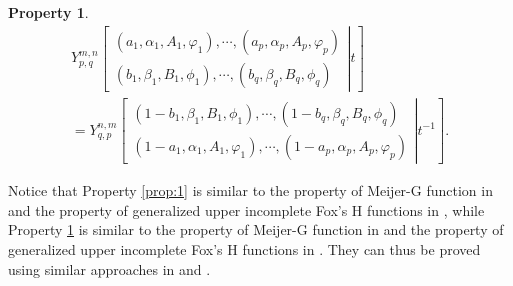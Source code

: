 \documentclass[12pt,onecolumn,draftcls]{IEEEtran}
\newtheorem{property}{Property}
\begin{document}
\begin{property}\label{prop:2}
\begin{multline}\label{eqn:x_1_fox_H}
Y_{p,q}^{m,n}\left[ {\left. {\begin{array}{*{20}{c}}
{\left( {{a_1},{\alpha _1},{A_1},{\varphi _1}} \right), \cdots ,\left( {{a_p},{\alpha _p},{A_p},{\varphi _p}} \right)}\\
{\left( {{b_1},{\beta _1},{B_1},{\phi _1}} \right), \cdots ,\left( {{b_q},{\beta _q},{B_q},{\phi _q}} \right)}
\end{array}} \right|t} \right]\\
 = Y_{q,p}^{n,m}\left[ {\left. {\begin{array}{*{20}{c}}
{\left( { 1 - {b_1},{\beta _1},{B_1},{\phi _1}} \right), \cdots ,\left( { 1 - {b_q},{\beta _q},{B_q},{\phi _q}} \right)}\\
{\left( { 1 - {a_1},{\alpha _1},{A_1},{\varphi _1}} \right), \cdots ,\left( { 1 - {a_p},{\alpha _p},{A_p},{\varphi _p}} \right)}
\end{array}} \right|t^{-1}} \right].
\end{multline}
\end{property}

Notice that Property \ref{prop:1} is similar to the property of Meijer-G function in \cite[Eq.9.31.5]{gradshteyn1965table} and the property of generalized upper incomplete Fox's H functions in \cite[Eq.A.10]{yilmaz2009productshifted}, while Property \ref{prop:2} is similar to the property of Meijer-G function in \cite[Eq.9.31.2]{gradshteyn1965table} and the property of generalized upper incomplete Fox's H functions in \cite[Eq.A.9]{yilmaz2009productshifted}. They can thus be proved using similar approaches in \cite{yilmaz2009productshifted} and \cite{gradshteyn1965table}.
\end{document}
